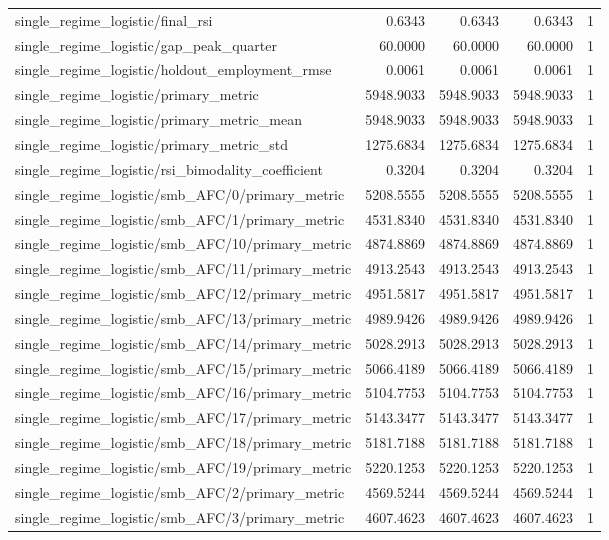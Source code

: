\begin{table}[h]
\begin{tabular}{lrrrr}
single_regime_logistic/final_rsi & 0.6343 & 0.6343 & 0.6343 & 1 \\
single_regime_logistic/gap_peak_quarter & 60.0000 & 60.0000 & 60.0000 & 1 \\
single_regime_logistic/holdout_employment_rmse & 0.0061 & 0.0061 & 0.0061 & 1 \\
single_regime_logistic/primary_metric & 5948.9033 & 5948.9033 & 5948.9033 & 1 \\
single_regime_logistic/primary_metric_mean & 5948.9033 & 5948.9033 & 5948.9033 & 1 \\
single_regime_logistic/primary_metric_std & 1275.6834 & 1275.6834 & 1275.6834 & 1 \\
single_regime_logistic/rsi_bimodality_coefficient & 0.3204 & 0.3204 & 0.3204 & 1 \\
single_regime_logistic/smb_AFC/0/primary_metric & 5208.5555 & 5208.5555 & 5208.5555 & 1 \\
single_regime_logistic/smb_AFC/1/primary_metric & 4531.8340 & 4531.8340 & 4531.8340 & 1 \\
single_regime_logistic/smb_AFC/10/primary_metric & 4874.8869 & 4874.8869 & 4874.8869 & 1 \\
single_regime_logistic/smb_AFC/11/primary_metric & 4913.2543 & 4913.2543 & 4913.2543 & 1 \\
single_regime_logistic/smb_AFC/12/primary_metric & 4951.5817 & 4951.5817 & 4951.5817 & 1 \\
single_regime_logistic/smb_AFC/13/primary_metric & 4989.9426 & 4989.9426 & 4989.9426 & 1 \\
single_regime_logistic/smb_AFC/14/primary_metric & 5028.2913 & 5028.2913 & 5028.2913 & 1 \\
single_regime_logistic/smb_AFC/15/primary_metric & 5066.4189 & 5066.4189 & 5066.4189 & 1 \\
single_regime_logistic/smb_AFC/16/primary_metric & 5104.7753 & 5104.7753 & 5104.7753 & 1 \\
single_regime_logistic/smb_AFC/17/primary_metric & 5143.3477 & 5143.3477 & 5143.3477 & 1 \\
single_regime_logistic/smb_AFC/18/primary_metric & 5181.7188 & 5181.7188 & 5181.7188 & 1 \\
single_regime_logistic/smb_AFC/19/primary_metric & 5220.1253 & 5220.1253 & 5220.1253 & 1 \\
single_regime_logistic/smb_AFC/2/primary_metric & 4569.5244 & 4569.5244 & 4569.5244 & 1 \\
single_regime_logistic/smb_AFC/3/primary_metric & 4607.4623 & 4607.4623 & 4607.4623 & 1 \\

\end{tabular}
\end{table}
